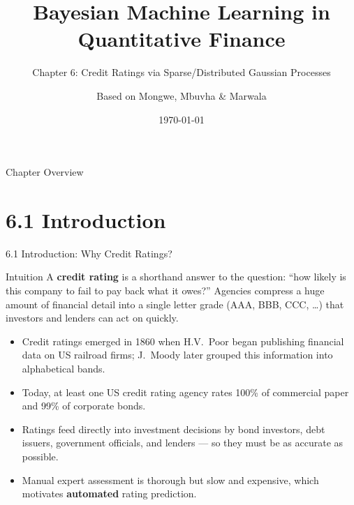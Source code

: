 \documentclass[aspectratio=169,10pt]{beamer}
\title[Bayesian ML in QF -- Ch.6]{Bayesian Machine Learning in Quantitative Finance}
\subtitle{Chapter 6: Credit Ratings via Sparse/Distributed Gaussian Processes}
\author{Based on Mongwe, Mbuvha \& Marwala}
\date{\today}
\begin{document}

\begin{frame}
  \titlepage
\end{frame}

\begin{frame}{Chapter Overview}
  \tableofcontents
\end{frame}

\section{6.1 Introduction}

\begin{frame}[allowframebreaks]{6.1 Introduction: Why Credit Ratings?}
  \begin{block}{Intuition}
    A \textbf{credit rating} is a shorthand answer to the question: ``how likely
    is this company to fail to pay back what it owes?'' Agencies compress a huge
    amount of financial detail into a single letter grade (AAA, BBB, CCC, \ldots)
    that investors and lenders can act on quickly.
  \end{block}
  \begin{itemize}
    \item Credit ratings emerged in 1860 when H.V.\ Poor began publishing
          financial data on US railroad firms; J.\ Moody later grouped this
          information into alphabetical bands.
    \item Today, at least one US credit rating agency rates 100\% of commercial
          paper and 99\% of corporate bonds.
    \item Ratings feed directly into investment decisions by bond investors,
          debt issuers, government officials, and lenders --- so they must be
          as accurate as possible.
    \item Manual expert assessment is thorough but slow and expensive, which
          motivates \textbf{automated} rating prediction.
  \end{itemize}

  \framebreak


\end{frame}
\end{document}
